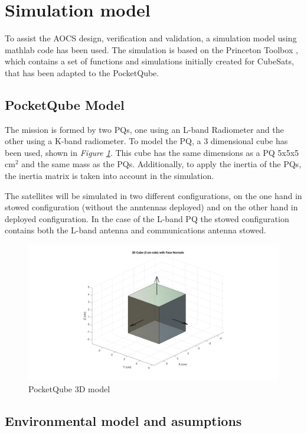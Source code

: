 
\section{Simulation model}
To assist the AOCS design, verification and validation, a simulation model using mathlab code has been used. The
simulation is based on the Princeton Toolbox \cite{PrincetonToolbox}, which contains a set of functions and 
simulations initially created for CubeSats, that has been adapted to the PocketQube.

\subsection{PocketQube Model}
The mission is formed by two PQs, one using an L-band Radiometer and the other using a K-band radiometer. To model the PQ, a 3 dimensional cube has
been used, shown in \textit{Figure \ref{fig:PQmodel}}. This cube has the same dimensions as a PQ 5x5x5 cm$^2$ and the same mass as the PQs. Additionally, to apply the inertia of the PQs, the 
inertia matrix is taken into account in the simulation.\vspace{0.2em}

\noindent The satellites will be simulated in two different configurations, on the one hand in stowed configuration (without the anntennas deployed) and on the other
hand in deployed configuration. In the case of the L-band PQ the stowed configuration contains both the L-band antenna and communications antenna
stowed.
    \begin{figure}[H]
        \centering
        \includegraphics[width=0.8\linewidth]{res/img/3_simulation_performance/PQ model.png}
        \caption{PocketQube 3D model}
        \label{fig:PQmodel}
    \end{figure}

\subsection{Environmental model and asumptions}

